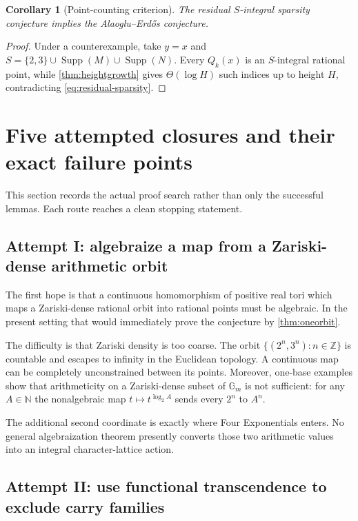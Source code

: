 \documentclass[11pt,oneside]{article}
\newtheorem{corollary}[theorem]{Corollary}
\theoremstyle{definition}
\newcommand{\Z}{\mathbb{Z}}
\newcommand{\N}{\mathbb{N}}
\newcommand{\Gm}{\mathbb{G}_{m}}
\newcommand{\Supp}{\operatorname{Supp}}
\begin{document}
\begin{corollary}[Point-counting criterion]\label{cor:pointcriterion}
The residual $S$-integral sparsity conjecture implies the Alaoglu--Erd\H{o}s conjecture.
\end{corollary}

\begin{proof}
Under a counterexample, take $y=x$ and
$S=\{2,3\}\cup\Supp(M)\cup\Supp(N)$.  Every $Q_k(x)$ is an $S$-integral rational point, while \cref{thm:heightgrowth} gives $\Theta(\log H)$ such indices up to height $H$, contradicting \eqref{eq:residual-sparsity}.
\end{proof}

\section{Five attempted closures and their exact failure points}

This section records the actual proof search rather than only the successful lemmas.  Each route reaches a clean stopping statement.

\subsection{Attempt I: algebraize a map from a Zariski-dense arithmetic orbit}

The first hope is that a continuous homomorphism of positive real tori which maps a Zariski-dense rational orbit into rational points must be algebraic.  In the present setting that would immediately prove the conjecture by \cref{thm:oneorbit}.

The difficulty is that Zariski density is too coarse.  The orbit
$\{(2^n,3^n):n\in\Z\}$ is countable and escapes to infinity in the Euclidean topology.  A continuous map can be completely unconstrained between its points.  Moreover, one-base examples show that arithmeticity on a Zariski-dense subset of $\Gm$ is not sufficient: for any $A\in\N$ the nonalgebraic map $t\mapsto t^{\log_2A}$ sends every $2^n$ to $A^n$.

The additional second coordinate is exactly where Four Exponentials enters.  No general algebraization theorem presently converts those two arithmetic values into an integral character-lattice action.

\subsection{Attempt II: use functional transcendence to exclude carry families}
\end{document}
